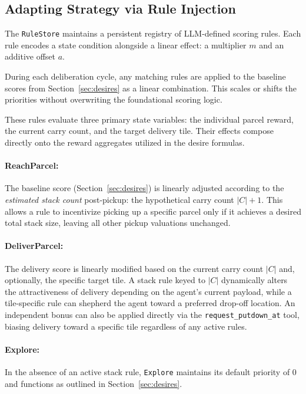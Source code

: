 \subsection{Adapting Strategy via Rule Injection}
\label{sec:scoring_rules}
The \texttt{RuleStore} maintains a persistent registry of LLM-defined scoring rules.
Each rule encodes a state condition alongside a linear effect: a multiplier $m$ and an additive offset $a$.

During each deliberation cycle, any matching rules are applied to the baseline scores from Section~\ref{sec:desires} as a linear combination.
This scales or shifts the priorities without overwriting the foundational scoring logic.

These rules evaluate three primary state variables: the individual parcel reward, the current carry count, and the target delivery tile.
Their effects compose directly onto the reward aggregates utilized in the desire formulas.

\paragraph{ReachParcel:}
The baseline score (Section~\ref{sec:desires}) is linearly adjusted according to the \emph{estimated stack count} post-pickup: the hypothetical carry count $|C|+1$.
This allows a rule to incentivize picking up a specific parcel only if it achieves a desired total stack size, leaving all other pickup valuations unchanged.

\paragraph{DeliverParcel:}
The delivery score is linearly modified based on the current carry count $|C|$ and, optionally, the specific target tile.
A stack rule keyed to $|C|$ dynamically alters the attractiveness of delivery depending on the agent's current payload, while a tile-specific rule can shepherd the agent toward a preferred drop-off location.
An independent bonus can also be applied directly via the \texttt{request\_putdown\_at} tool, biasing delivery toward a specific tile regardless of any active rules.

\paragraph{Explore:}
In the absence of an active stack rule, \texttt{Explore} maintains its default priority of 0 and functions as outlined in Section~\ref{sec:desires}.

